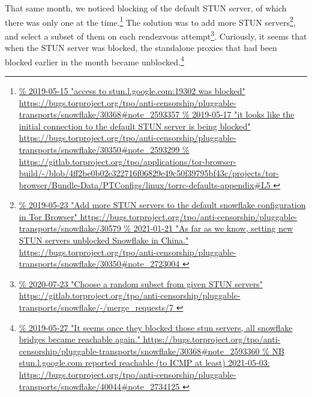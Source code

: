 \documentclass[letterpaper,twocolumn]{article}
\newlength{\urlfootnotesize}
\newcommand{\urlfootnote}[1]{\footnote{
\raggedright\fontsize{\urlfootnotesize}{\urlfootnotesize}\selectfont\url{#1}
}}
\begin{document}
That same month, we noticed blocking of
the default STUN server,
of which there was only one at the time.\urlfootnote{
https://bugs.torproject.org/tpo/anti-censorship/pluggable-transports/snowflake/30368\#note_2593357
}
The solution was to add more STUN servers\urlfootnote{
https://bugs.torproject.org/tpo/anti-censorship/pluggable-transports/snowflake/30579
},
and select a subset of them on each rendezvous attempt\urlfootnote{
https://gitlab.torproject.org/tpo/anti-censorship/pluggable-transports/snowflake/-/merge_requests/7
}.
Curiously, it seems that when the STUN server was blocked,
the standalone proxies that had been blocked earlier in the month became unblocked.\urlfootnote{
https://bugs.torproject.org/tpo/anti-censorship/pluggable-transports/snowflake/30368\#note_2593360
}
\end{document}
